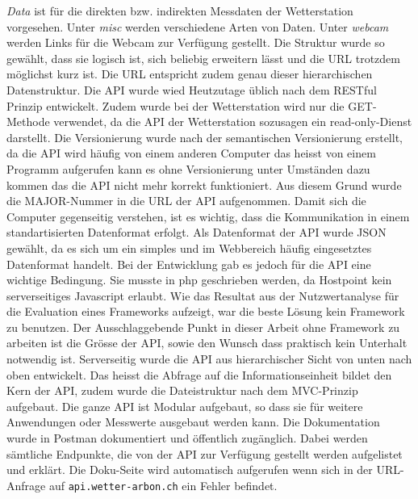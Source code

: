 \documentclass[11pt]{article}
\begin{document}
\begin{multicols}{2}
\emph{Data} ist für die direkten bzw. indirekten Messdaten der Wetterstation vorgesehen. Unter \emph{misc} werden verschiedene Arten von Daten. Unter \emph{webcam} werden Links für die Webcam zur Verfügung gestellt. Die Struktur wurde so gewählt, dass sie logisch ist, sich beliebig erweitern lässt und die URL trotzdem möglichst kurz ist. Die URL entspricht zudem genau dieser hierarchischen Datenstruktur. Die API wurde wied Heutzutage üblich nach dem RESTful Prinzip entwickelt. Zudem wurde bei  der Wetterstation wird nur die GET-Methode verwendet, da die API der Wetterstation sozusagen ein read-only-Dienst darstellt. Die Versionierung wurde nach der semantischen Versionierung erstellt, da die API wird häufig von einem anderen Computer das heisst von einem Programm aufgerufen kann es ohne Versionierung unter Umständen dazu kommen das die API nicht mehr korrekt funktioniert. Aus diesem Grund wurde die MAJOR-Nummer in die URL der API aufgenommen. Damit sich die Computer gegenseitig verstehen, ist es wichtig, dass die Kommunikation in einem standartisierten Datenformat erfolgt. Als Datenformat der API wurde JSON gewählt, da es sich um ein simples und im Webbereich häufig eingesetztes Datenformat handelt. Bei der Entwicklung gab es jedoch für die API eine wichtige Bedingung. Sie musste in php geschrieben werden, da Hostpoint kein serverseitiges Javascript erlaubt.  Wie das Resultat aus der Nutzwertanalyse für die Evaluation eines Frameworks aufzeigt, war die beste Lösung kein Framework zu benutzen. Der Ausschlaggebende Punkt in dieser Arbeit ohne Framework zu arbeiten ist die Grösse der API, sowie den Wunsch dass praktisch kein Unterhalt notwendig ist. Serverseitig wurde die API aus hierarchischer Sicht von unten nach oben entwickelt. Das heisst die Abfrage auf die Informationseinheit bildet den Kern der API, zudem wurde die Dateistruktur nach dem MVC-Prinzip aufgebaut. Die ganze API ist Modular aufgebaut, so dass sie für weitere Anwendungen oder Messwerte ausgebaut werden kann. Die Dokumentation wurde in Postman dokumentiert und öffentlich zugänglich.  Dabei werden sämtliche Endpunkte, die von der API zur Verfügung gestellt werden aufgelistet und erklärt. Die Doku-Seite wird automatisch aufgerufen wenn sich in der URL-Anfrage auf \texttt{api.wetter-arbon.ch} ein Fehler befindet.\\


\end{multicols}
\end{document}
